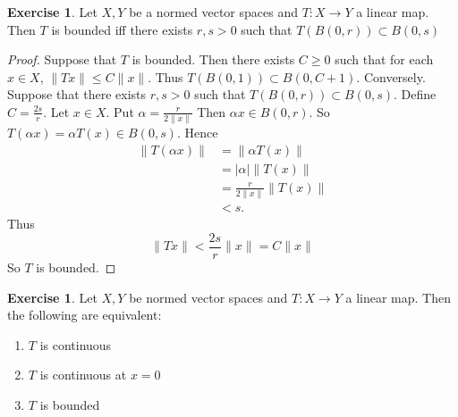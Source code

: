 \documentclass[12pt]{amsart}
\theoremstyle{definition}
\newtheorem{ex}[definition]{Exercise}
\newcommand{\al}{\alpha}
\begin{document}
	\begin{ex}
		Let $X,Y$ be a normed vector spaces and $T:X \rightarrow Y$ a linear map. Then $T$ is bounded iff there exists $r,s>0$ such that $T(B(0,r)) \subset B(0,s)$
	\end{ex}
	
	\begin{proof}
		Suppose that $T$ is bounded. Then there exists $C \geq 0$ such that for each $x \in X$, $\|Tx \|\leq C \|x \|$. Thus $T(B(0,1)) \subset B(0,C+1)$. Conversely. Suppose that there exists $r,s >0$ such that $T(B(0,r)) \subset B(0,s)$. Define $C = \frac{2s}{r}$. Let $x \in X$. Put $\al = \frac{r}{2\|x \|}$ Then $\al x \in B(0,r)$. So $T(\al x ) = \al T(x) \in B(0,s)$. Hence 
		\begin{align*}
			\|T(\al x) \|
			&= \|\al T(x) \|\\
			&= \vert \al \vert \|T(x) \|\\
			& = \frac{r}{2 \|x \|}  \|T(x) \|\\
			& < s.
		\end{align*}
		Thus $$\|Tx \|< \frac{2 s}{r} \|x \|= C \|x \|$$ So $T$ is bounded. 
	\end{proof}
	
	\begin{ex}
		Let $X,Y$ be normed vector spaces and $T:X \rightarrow Y$ a linear map. Then the following are equivalent:
		\begin{enumerate}
			\item $T$ is continuous
			\item $T$ is continuous at $x=0$
			\item $T$ is bounded
		\end{enumerate}
	\end{ex}
	
\end{document}
